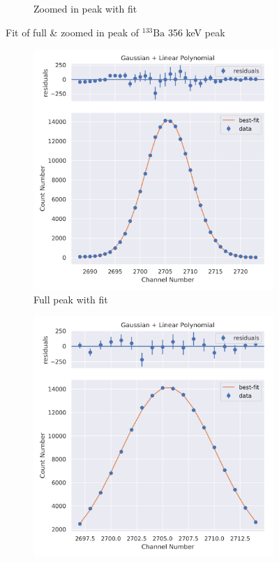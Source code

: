 \documentclass[11pt,a4paper]{article}
\newcommand{\element}[2]{$^{#2}\textrm{#1}$}
\begin{document}
\begin{figure}[H]
\begin{subfigure}{.5\linewidth}
    \caption{Zoomed in peak with fit}
  \end{subfigure}
  \caption{Fit of full \& zoomed in peak of \element{Ba}{133} 356 keV peak}
\end{figure}
\begin{figure}[H]
  \centering
  \begin{subfigure}{.5\linewidth}
    \centering
    \includegraphics[width=\linewidth]{./Images/Barium133/Linear/Linear_7_Full.png}
    \caption{Full peak with fit}
  \end{subfigure}%
  \begin{subfigure}{.5\linewidth}
    \centering
    \includegraphics[width=\linewidth]{./Images/Barium133/Linear/Linear_7_Zoom.png}

\end{subfigure}
\end{figure}
\end{document}
